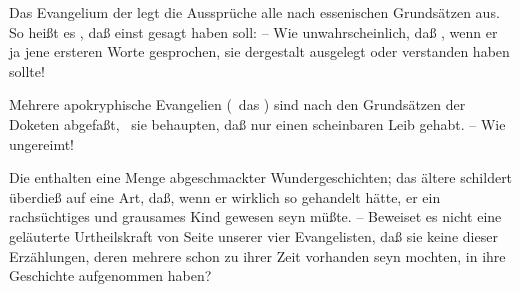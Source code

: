 \begin{aufza}
\begin{aufzb}
\item Das Evangelium der  legt die Aussprüche  alle nach essenischen Grundsätzen aus. So heißt es \zB , daß  einst gesagt haben soll:  -- Wie unwahrscheinlich, daß , wenn er ja jene ersteren Worte gesprochen, sie dergestalt ausgelegt oder verstanden haben sollte!
\item Mehrere apokryphische Evangelien (\zB\ das ) sind nach den Grundsätzen der Doketen abgefaßt, \dh\ sie behaupten, daß  nur einen scheinbaren Leib gehabt. -- Wie ungereimt!
\item Die  enthalten eine Menge abgeschmackter Wundergeschichten; das ältere schildert überdieß  auf eine Art, daß, wenn er wirklich so gehandelt hätte, er ein rachsüchtiges und grausames Kind gewesen seyn müßte. -- Beweiset es nicht eine geläuterte Urtheilskraft von Seite unserer vier Evangelisten, daß sie keine dieser Erzählungen, deren mehrere schon zu ihrer Zeit vorhanden seyn mochten, in ihre Geschichte aufgenommen haben?

\end{aufzb}
\end{aufza}
